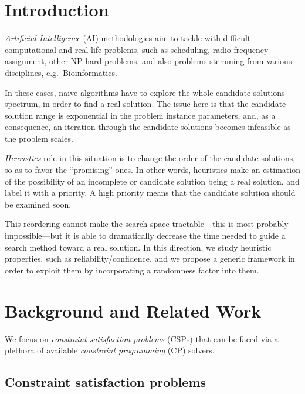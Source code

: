 \documentclass{ws-ijait}
\begin{document}


\section{Introduction}

\emph{Artificial Intelligence} (AI) methodologies aim to
tackle with difficult computational and real life problems,
such as scheduling,\cite{pinedo-scheduling} radio frequency
assignment,\cite{radio-link} other NP-hard problems, and
also problems stemming from various disciplines, e.g.\ 
Bioinformatics.\cite{bioinformatics}

In these cases, naive algorithms have to explore the whole
candidate solutions spectrum, in order to find a real
solution. The issue here is that the candidate solution
range is exponential in the problem instance parameters,
and, as a consequence, an iteration through the candidate
solutions becomes infeasible as the problem scales.

\emph{Heuristics} role in this situation is to change the
order of the candidate solutions, so as to favor the
``promising'' ones. In other words, heuristics make an
estimation of the possibility of an incomplete or candidate
solution being a real solution, and label it with a
priority. A high priority means that the candidate solution
should be examined soon.

This reordering cannot make the search space
tractable---this is most probably
impossible\cite{p-np}---but it is able to dramatically
decrease the time needed to guide a search method toward a
real solution. In this direction, we study heuristic
properties, such as reliability\slash confidence, and we
propose a generic framework in order to exploit them by
incorporating a randomness factor into them.


\section{Background and Related Work}

We focus on \emph{constraint satisfaction problems}
(CSPs)\cite{CSP} that can be faced via a plethora of
available \emph{constraint programming} (CP)
solvers.\cite{eclipse,ilog}

\subsection{Constraint satisfaction problems}
\end{document}
